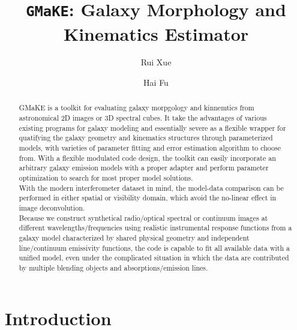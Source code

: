 \documentclass[twocolumn,tighten]{aastex62}
\newcommand{\gmake}{{\tt GMaKE}}
\begin{document}
\title{\gmake: Galaxy Morphology and Kinematics Estimator}

\author[0000-0001-7689-9305]{Rui Xue}

\author[0000-0001-9608-6395]{Hai Fu}


\begin{abstract}

GMaKE is a toolkit for evaluating galaxy morpgology and kinnemtics from astronomical 2D images or 3D spectral cubes.
It take the advantages of various existing programs for galaxy modeling and essentially severe as a flexible wrapper for quatifying the galaxy geometry and kinematics structures through parameterized models, with varieties of parameter fitting and error estimation algorithm to choose from. 
With a flexible modulated code design, the toolkit can easily incorporate an arbitrary galaxy emission models with a proper adapter and perform parameter optimization to search for most proper model solutions.\\
With the modern interferometer dataset in mind, the model-data comparison can be performed in either spatial or visibility domain, which avoid the no-linear effect in image deconvolution.\\
Because we construct synthetical radio/optical spectral or continuum images at different wavelengths/frequencies using realistic instrumental response functions from a galaxy model characterized by shared physical geometry and independent line/continuum emissivity functions, the code is capable to fit all available data with a unified model, even under the complicated situation in which the data are contributed by multiple blending objects and absorptions/emission lines.




\end{abstract}


\tableofcontents

\section{Introduction}
\end{document}
